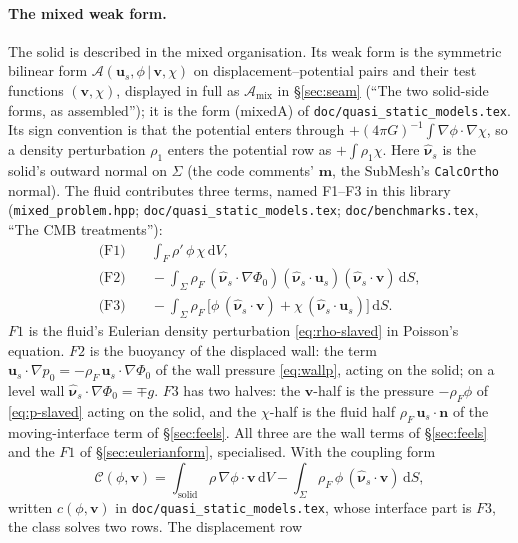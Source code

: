 \documentclass[11pt]{article}
\theoremstyle{definition}
\theoremstyle{remark}
\newcommand{\bu}{\mathbf{u}}
\newcommand{\bv}{\mathbf{v}}
\newcommand{\bn}{\mathbf{n}}
\newcommand{\dS}{\,\mathrm{d}S}
\newcommand{\dV}{\,\mathrm{d}V}
\newcommand{\code}[1]{\texttt{#1}}
\newcommand{\nuhs}{\hat{\boldsymbol{\nu}}_s}
\begin{document}
\paragraph{The mixed weak form.} The solid is described in the mixed
organisation. Its weak form is the symmetric bilinear form $\mathcal
A(\bu_s, \phi\,|\,\bv, \chi)$ on displacement--potential pairs and
their test functions $(\bv, \chi)$, displayed in full as $\mathcal
A_{\mathrm{mix}}$ in \S\ref{sec:seam} (``The two solid-side forms, as
assembled''); it is the form (mixedA) of
\code{doc/quasi\_static\_models.tex}. Its sign convention is that the
potential enters through $+(4\pi G)^{-1}\int\nabla\phi\cdot\nabla\chi$,
so a density perturbation $\rho_1$ enters the potential row as
$+\int\rho_1\chi$. Here $\nuhs$ is the solid's outward normal on
$\Sigma$ (the code comments' $\mathbf m$, the SubMesh's
\code{CalcOrtho} normal). The fluid contributes three terms, named
F1--F3 in this library (\code{mixed\_problem.hpp};
\code{doc/quasi\_static\_models.tex}; \code{doc/benchmarks.tex}, ``The
CMB treatments''):
\begin{align}
  \text{(F1)}&\quad \int_F\rho'\,\phi\,\chi\dV ,
  \nonumber\\
  \text{(F2)}&\quad -\int_\Sigma\rho_F\,(\nuhs\cdot\nabla\Phi_0)
    (\nuhs\cdot\bu_s)(\nuhs\cdot\bv)\dS ,
  \label{eq:F123}\\
  \text{(F3)}&\quad -\int_\Sigma\rho_F\,\bigl[\phi\,(\nuhs\cdot\bv)
    + \chi\,(\nuhs\cdot\bu_s)\bigr]\dS .
  \nonumber
\end{align}
$F1$ is the fluid's Eulerian density perturbation
\eqref{eq:rho-slaved} in Poisson's equation. $F2$ is the buoyancy of the
displaced wall: the term $\bu_s\cdot\nabla p_0 =
-\rho_F\,\bu_s\cdot\nabla\Phi_0$ of the wall pressure \eqref{eq:wallp},
acting on the solid; on a level wall $\nuhs\cdot\nabla\Phi_0 = \mp g$.
$F3$ has two halves: the $\bv$-half is the pressure $-\rho_F\phi$ of
\eqref{eq:p-slaved} acting on the solid, and the $\chi$-half is the
fluid half $\rho_F\,\bu_s\cdot\bn$ of the moving-interface term of
\S\ref{sec:feels}. All three are the wall terms of \S\ref{sec:feels}
and the $F1$ of \S\ref{sec:eulerianform}, specialised. With the coupling
form
\begin{equation*}
  \mathcal C(\phi, \bv) = \int_{\text{solid}}\rho\,\nabla\phi\cdot\bv\dV
  - \int_\Sigma\rho_F\,\phi\,(\nuhs\cdot\bv)\dS ,
\end{equation*}
written $c(\phi, \bv)$ in \code{doc/quasi\_static\_models.tex}, whose
interface part is $F3$, the class solves two rows. The displacement row
\end{document}

